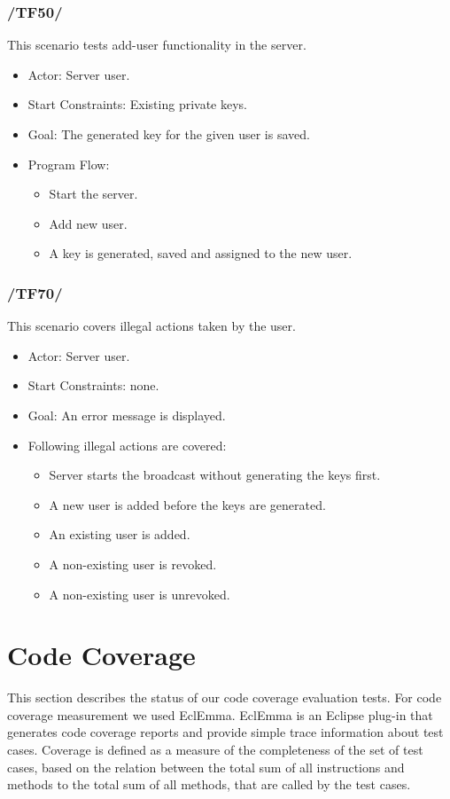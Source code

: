 \documentclass[a4paper,10pt]{scrartcl}
\begin{document}
\subsubsection{/TF50/}
This scenario tests add-user functionality in the server.

\begin{itemize}
	\item Actor: Server user.
	\item Start Constraints: Existing private keys.
	\item Goal: The generated key for the given user is saved.
	\item Program Flow:
	\begin{itemize}
   \item Start the server.
   \item Add new user.
   \item A key is generated, saved and assigned to the new user.
\end{itemize}
\end{itemize}

\subsubsection{/TF70/}
This scenario covers illegal actions taken by the user.

\begin{itemize}
	\item Actor: Server user.
	\item Start Constraints: none.
	\item Goal: An error message is displayed.
	\item Following illegal actions are covered:
	\begin{itemize}
   \item Server starts the broadcast without generating the keys first.
   \item A new user is added before the keys are generated.
   \item An existing user is added.
   \item A non-existing user is revoked.
   \item A non-existing user is unrevoked.
\end{itemize}
\end{itemize}


\section{Code Coverage}
This section describes the status of our code coverage evaluation tests. For code coverage measurement we used EclEmma.
EclEmma is an Eclipse plug-in that generates code coverage reports and provide simple trace information about test cases. Coverage is defined as a measure of the completeness of the set of test cases, based on the relation between the total sum of all instructions and methods to the total sum of all methods, that are called by the test cases.
\end{document}
